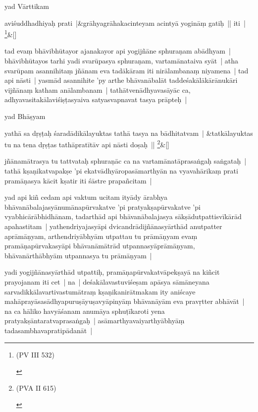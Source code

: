 \documentclass[article,a4paper]{memoir}
\newcommand{\name}[1]{#1}
\begin{document}
	  \pstart yad Vā\-rttikam 
	\pend
      
	    
	    \stanza[\smallbreak]
aviśuddhadhiyaḥ prati |&grā\-hyagrā\-hakacinteyam acintyā\- yoginā\-ṃ gatiḥ || iti | \footnote{\begin{english}(PV III 532)\end{english}}\&[\smallbreak]


	

	  \pstart tad evaṃ bhā\-vibhū\-tayor ajanakayor api yogijñā\-ne sphuraṇam abā\-dhyam | bhā\-vibhū\-tayos tarhi yadi svarū\-pasya sphuraṇam, vartamā\-nataiva syā\-t | atha svarū\-pam asannihitaṃ jñā\-nam eva tadā\-kā\-ram iti nirā\-lambanaṃ niyamena | tad api nā\-sti | yasmā\-d asannihite 'py arthe bhā\-vanā\-balā\-t taddeśakā\-lā\-kā\-rā\-nukā\-ri vijñā\-naṃ katham anā\-lambanam | tathā\-tvenā\-dhyavasā\-yā\-c ca, adhyavasitakā\-laviśiṣṭasyaiva satyasvapnavat tasya prā\-pteḥ | 
	\pend
      

	  \pstart yad \name{Bhā\-ṣyam}
	\pend
      
	    
	    \stanza[\smallbreak]
yathā\- sa dṛṣṭaḥ śaradā\-dikā\-layuktas tathā\- tasya na bā\-dhitatvam | &tatkā\-layuktas tu na tena dṛṣṭas tathā\-pratī\-tā\-v api nā\-sti doṣaḥ || \footnote{\begin{english}(PVA II 615)\end{english}}\&[\smallbreak]


	

	  \pstart jñā\-namā\-trasya tu tattvataḥ sphuraṇā\-c ca na vartamā\-natā\-prasaṅgaḥ saṅgataḥ | tathā\- kṣaṇikatvapakṣe 'pi ekatvā\-dhyā\-ropasā\-marthyā\-n na vyavahā\-rikaṃ prati pramā\-ṇasya kā\-cit kṣatir iti śā\-stre prapañcitam | 
	\pend
      

	  \pstart yad api kiñ cedam api vaktum ucitam ityā\-dy ā\-rabhya bhā\-vanā\-balajasyā\-numā\-napū\-rvakatve 'pi pratyakṣapū\-rvakatve 'pi vyabhicā\-rā\-bhidhā\-nam, tadarthā\-d api bhā\-vanā\-balajasya sā\-kṣā\-dutpattisvī\-kā\-rā\-d apahastitam | yathendriyajasyā\-pi dvicandrā\-dijñā\-nasyā\-rthā\-d anutpatter aprā\-mā\-ṇyam, arthendriyā\-bhyā\-m utpattau tu prā\-mā\-ṇyam evaṃ pramā\-ṇapū\-rvakasyā\-pi bhā\-vanā\-mā\-trā\-d utpannasyā\-prā\-mā\-ṇyam, bhā\-vanā\-rthā\-bhyā\-m utpannasya tu prā\-mā\-ṇyam | 
	\pend
      

	  \pstart yadi yogijñā\-nasyā\-rthā\-d utpattiḥ, pramā\-ṇapū\-rvakatvā\-pekṣayā\- na kiñcit prayojanam iti cet | na | deśakā\-lavastuviśeṣam apā\-sya sā\-mā\-neyana sarvadikkā\-lavartivastumā\-traṃ kṣaṇikanirā\-tmakam ity aniścaye mahā\-prayā\-sasā\-dhyapuruṣā\-yuṣavyā\-pinyā\-ṃ bhā\-vanā\-yā\-m eva pravṛtter abhā\-vā\-t | na ca hā\-liko havyā\-śanam anumā\-ya sphuṭī\-karoti yena pratyakṣā\-ntaratvaprasaṅgaḥ | asā\-marthyavaiyarthyā\-bhyā\-ṃ tadasambhavapratipā\-danā\-t | 
	\pend
      
\end{document}
